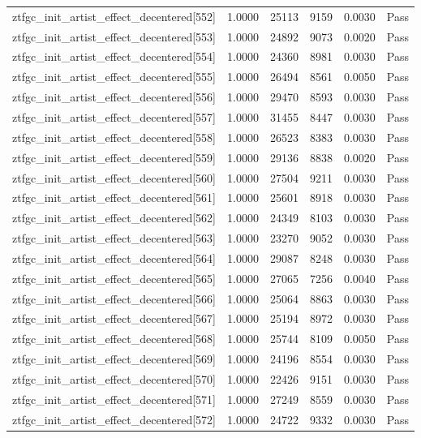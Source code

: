 \begin{table}[htbp]
\begin{tabular}{llrrll}
ztfgc\_init\_artist\_effect\_decentered[552] & 1.0000 & 25113 & 9159 & 0.0030 & Pass \\
ztfgc\_init\_artist\_effect\_decentered[553] & 1.0000 & 24892 & 9073 & 0.0020 & Pass \\
ztfgc\_init\_artist\_effect\_decentered[554] & 1.0000 & 24360 & 8981 & 0.0030 & Pass \\
ztfgc\_init\_artist\_effect\_decentered[555] & 1.0000 & 26494 & 8561 & 0.0050 & Pass \\
ztfgc\_init\_artist\_effect\_decentered[556] & 1.0000 & 29470 & 8593 & 0.0030 & Pass \\
ztfgc\_init\_artist\_effect\_decentered[557] & 1.0000 & 31455 & 8447 & 0.0030 & Pass \\
ztfgc\_init\_artist\_effect\_decentered[558] & 1.0000 & 26523 & 8383 & 0.0030 & Pass \\
ztfgc\_init\_artist\_effect\_decentered[559] & 1.0000 & 29136 & 8838 & 0.0020 & Pass \\
ztfgc\_init\_artist\_effect\_decentered[560] & 1.0000 & 27504 & 9211 & 0.0030 & Pass \\
ztfgc\_init\_artist\_effect\_decentered[561] & 1.0000 & 25601 & 8918 & 0.0030 & Pass \\
ztfgc\_init\_artist\_effect\_decentered[562] & 1.0000 & 24349 & 8103 & 0.0030 & Pass \\
ztfgc\_init\_artist\_effect\_decentered[563] & 1.0000 & 23270 & 9052 & 0.0030 & Pass \\
ztfgc\_init\_artist\_effect\_decentered[564] & 1.0000 & 29087 & 8248 & 0.0030 & Pass \\
ztfgc\_init\_artist\_effect\_decentered[565] & 1.0000 & 27065 & 7256 & 0.0040 & Pass \\
ztfgc\_init\_artist\_effect\_decentered[566] & 1.0000 & 25064 & 8863 & 0.0030 & Pass \\
ztfgc\_init\_artist\_effect\_decentered[567] & 1.0000 & 25194 & 8972 & 0.0030 & Pass \\
ztfgc\_init\_artist\_effect\_decentered[568] & 1.0000 & 25744 & 8109 & 0.0050 & Pass \\
ztfgc\_init\_artist\_effect\_decentered[569] & 1.0000 & 24196 & 8554 & 0.0030 & Pass \\
ztfgc\_init\_artist\_effect\_decentered[570] & 1.0000 & 22426 & 9151 & 0.0030 & Pass \\
ztfgc\_init\_artist\_effect\_decentered[571] & 1.0000 & 27249 & 8559 & 0.0030 & Pass \\
ztfgc\_init\_artist\_effect\_decentered[572] & 1.0000 & 24722 & 9332 & 0.0030 & Pass \\

\end{tabular}
\end{table}
